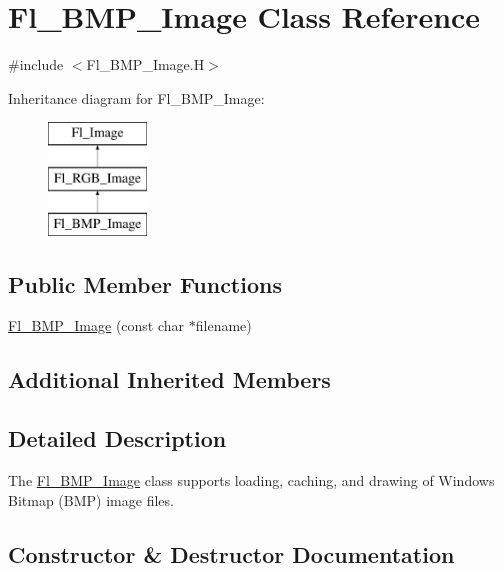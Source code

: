 \hypertarget{class_fl___b_m_p___image}{}\section{Fl\+\_\+\+B\+M\+P\+\_\+\+Image Class Reference}
\label{class_fl___b_m_p___image}


{\ttfamily \#include $<$Fl\+\_\+\+B\+M\+P\+\_\+\+Image.\+H$>$}

Inheritance diagram for Fl\+\_\+\+B\+M\+P\+\_\+\+Image\+:\begin{figure}[H]
\begin{center}
\leavevmode
\includegraphics[height=3.000000cm]{class_fl___b_m_p___image}
\end{center}
\end{figure}
\subsection*{Public Member Functions}
\begin{DoxyCompactItemize}
\item 
\hyperlink{class_fl___b_m_p___image_a1abb2ebb6ca113fd03a967b66624c868}{Fl\+\_\+\+B\+M\+P\+\_\+\+Image} (const char $\ast$filename)
\end{DoxyCompactItemize}
\subsection*{Additional Inherited Members}


\subsection{Detailed Description}
The \hyperlink{class_fl___b_m_p___image}{Fl\+\_\+\+B\+M\+P\+\_\+\+Image} class supports loading, caching, and drawing of Windows Bitmap (B\+MP) image files. 

\subsection{Constructor \& Destructor Documentation}
\mbox{\label{class_fl___b_m_p___image_a1abb2ebb6ca113fd03a967b66624c868}} 
